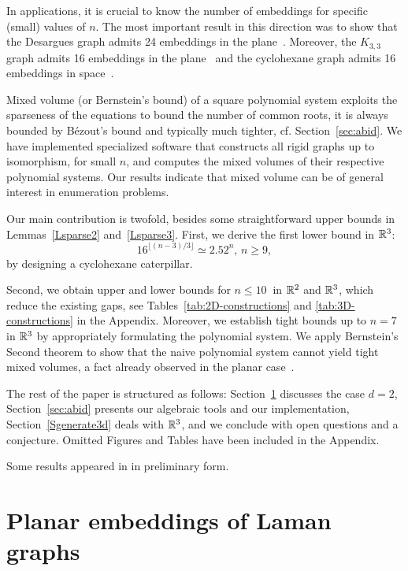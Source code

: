 \documentclass[envcountsame]{llncs}
\begin{document}
In applications, it is crucial to know the number of embeddings for specific 
(small) values of $n$.
The most important result in this direction was to show that the Desargues graph  admits 24
embeddings in the plane~\cite{BS04}. Moreover, the $K_{3,3}$ graph admits 16 embeddings in the plane~\cite{W77,WH07}  and 
the cyclohexane graph  admits 16 embeddings in space~\cite{EM99}.



Mixed volume (or Bernstein's bound) of a square polynomial system 
exploits the sparseness of the equations to bound the number of common roots,
it is always bounded by B\'ezout's bound and typically much tighter, cf. Section~\ref{sec:abid}.
We have implemented specialized software that  constructs  all rigid graphs up to isomorphism,
for small $n$, and computes  the mixed volumes of their respective polynomial systems.
Our results indicate that mixed volume can be of general interest in enumeration problems.

Our main contribution is twofold, besides some straightforward
upper bounds in Lemmas~\ref{Lsparse2} and~\ref{Lsparse3}. First, we derive the first lower bound in ${\mathbb R}^3$:
$$
16^{\lfloor (n-3)/3\rfloor} \simeq 2.52^n,\, n\ge 9,
$$
by designing a cyclohexane caterpillar.


Second, we obtain upper and lower  bounds for $n \le 10 \ $ in  ${\mathbb R}^2$  and ${\mathbb R}^3$, which  reduce the existing gaps, 
see Tables~\ref{tab:2D-constructions} and \ref{tab:3D-constructions} in the Appendix.
Moreover, we establish tight bounds up to $n = 7$ in ${\mathbb R}^3$ by
appropriately formulating the polynomial system.
We apply Bernstein's Second theorem to show that the naive polynomial
system cannot yield tight mixed volumes,
a fact already observed in the planar case~\cite{ST08}.



The rest of the paper is structured as follows: 
Section~\ref{sec:laman-2d} discusses the case $d=2$,
Section~\ref{sec:abid} presents our algebraic tools and our implementation,
Section~\ref{Sgenerate3d} deals with ${\mathbb R}^3$, and we conclude with open questions
and a conjecture.
Omitted Figures and Tables have been  included  in the Appendix.


Some results appeared in \cite{EV09} in preliminary form.



\section{Planar embeddings of Laman graphs} \label{sec:laman-2d} 
\end{document}
